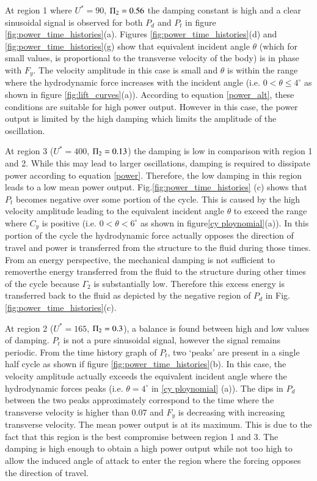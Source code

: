 At region 1 where $U^*=90$, $\Pi_2=0.56$ the damping constant is high and a clear sinusoidal signal is observed for both $P_d$ and $P_t$ in figure \ref{fig:power_time_histories}(a). Figures \ref{fig:power_time_histories}(d) and  \ref{fig:power_time_histories}(g) show that equivalent incident angle $\theta$ (which for small values, is proportional to the transverse velocity of the body) is in phase with $F_y$.  The velocity amplitude in this case is small and $\theta$ is within the range where the hydrodynamic force increases with the incident angle (i.e. $0<\theta \leq 4^\circ$ as shown in figure \ref{fig:lift_curves}(a)). According to equation \ref{power_alt}, these conditions are suitable for high power output. However in this case, the power output is limited by the high damping which limits the amplitude of the oscillation.
 
At region 3 ($U^*= 400$, $\Pi_2=0.13$) the damping is low in comparison with region 1 and 2. While this may lead to larger oscillations, damping is required to dissipate power according to equation \ref{power}. Therefore, the low damping in this region leads to a low mean power output. Fig.\ref{fig:power_time_histories} (c) shows that $P_t$ becomes negative over some portion of the cycle. This is caused by the high velocity amplitude leading to the equivalent incident angle $\theta$ to exceed the range where $C_y$ is positive (i.e. $0<\theta<6^\circ$ as shown in figure\ref{cy ploynomial}(a)). In this portion of the cycle the hydrodynamic force actually opposes the direction of travel and power is transferred from the structure to the fluid during those times. From an energy perspective, the mechanical damping is not sufficient to removerthe energy transferred from the fluid to the structure during other times of the cycle because $\Gamma_2$ is substantially low. Therefore this excess energy is transferred back to the fluid as depicted by the negative region of $P_d$ in Fig.\ref{fig:power_time_histories}(c). 
 
At region 2 ($U^*=165$, $\Pi_2=0.3$), a balance is found between high and low values of damping. $P_t$ is not a pure sinusoidal signal, however the signal remains periodic. From the time history graph of $P_t$, two `peaks' are present in a single half cycle as shown if figure \ref{fig:power_time_histories}(b). In this case, the velocity amplitude actually exceeds the equivalent incident angle where the hydrodynamic forces peaks (i.e. $\theta=4^\circ$ in \ref{cy ploynomial} (a)). The dips in $P_d$ between the two peaks approximately correspond to the time where the transverse velocity is higher than 0.07 and $F_y$ is decreasing with increasing transverse velocity. The mean power output is at its maximum. This is due to the fact that this region is the best compromise between region 1 and 3. The damping is high enough to obtain a high power output while not too high to allow the induced angle of attack to enter the region where the forcing opposes the direction of travel. 

